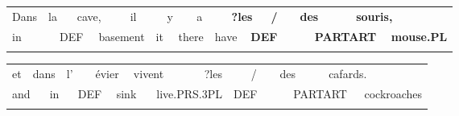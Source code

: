 \begin{tabular}{llllllllllllllllllll}
\lsptoprule
Dans & \multicolumn{2}{l}{la

} & \multicolumn{2}{l}{cave,

} & \multicolumn{2}{l}{il

} & \multicolumn{2}{l}{y

} & \multicolumn{2}{l}{a

} & \multicolumn{2}{l}{{\bfseries ?les}

} & \multicolumn{2}{l}{{\bfseries /}

} & \multicolumn{2}{l}{{\bfseries des}

} & \multicolumn{2}{l}{{\bfseries souris,}

} & \\
\multicolumn{2}{l}{in

} & \multicolumn{2}{l}{DEF

} & \multicolumn{2}{l}{basement

} & \multicolumn{2}{l}{it

} & \multicolumn{2}{l}{there

} & \multicolumn{2}{l}{have

} & \multicolumn{2}{l}{{\bfseries DEF}

} & \multicolumn{2}{l}{} & \multicolumn{2}{l}{{\bfseries PARTART}

} & \multicolumn{2}{l}{{\bfseries mouse.PL}

}\\
\lspbottomrule
\end{tabular}

\begin{tabular}{llllllllllllllllll}
\lsptoprule
et & \multicolumn{2}{l}{dans

} & \multicolumn{2}{l}{l’

} & \multicolumn{2}{l}{évier

} & \multicolumn{2}{l}{vivent

} & \multicolumn{2}{l}{?les

} & \multicolumn{2}{l}{/

} & \multicolumn{2}{l}{des

} & \multicolumn{2}{l}{cafards.

} & \\
\multicolumn{2}{l}{and

} & \multicolumn{2}{l}{in

} & \multicolumn{2}{l}{DEF

} & \multicolumn{2}{l}{sink

} & \multicolumn{2}{l}{live.PRS.3PL

} & \multicolumn{2}{l}{DEF

} & \multicolumn{2}{l}{} & \multicolumn{2}{l}{PARTART

} & \multicolumn{2}{l}{cockroaches

}\\
\lspbottomrule
\end{tabular}

